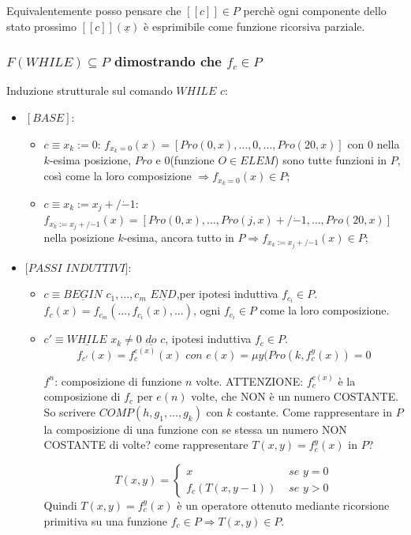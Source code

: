 \documentclass{article}
\begin{document}
Equivalentemente posso pensare che $[[c]] \in P$ perchè ogni componente dello stato prossimo $[[c]](\underline{x})$ è esprimibile come funzione ricorsiva parziale.


\subsubsection{$F(WHILE) \subseteq P$ dimostrando che $f_c \in P$}
Induzione strutturale sul comando $WHILE$ $c$:
\begin{itemize}
	\item $[BASE]$: 
		\begin{itemize}
			\item $c \equiv x_k:=0$: $f_{x_k=0}(x)=[Pro(0,x),\dots, 0, \dots, Pro(20,x)]$ con $0$ nella $k$-esima posizione, $Pro$ e $0$(funzione $O \in ELEM$) sono tutte funzioni in $P$, così come la loro composizione $\Rightarrow f_{x_k=0}(x) \in P$;
			\item $c \equiv x_k:=x_j +/\dot{-} 1$: $f_{x_k:=x_j +/\dot{-} 1}(x)= [Pro(0,x),\dots, Pro(j,x)+/\dot{-}1, \dots, Pro(20,x)]$ nella posizione $k$-esima, ancora tutto in $P \Rightarrow f_{x_k:=x_j +/\dot{-} 1}(x) \in P$;
		\end{itemize}
	\item $[PASSI$ $INDUTTIVI]$:
		\begin{itemize}
			\item $c \equiv \underline{BEGIN}$ $c_1,\dots,c_m$ $\underline{END}$,per ipotesi induttiva $f_{c_i} \in P$. $f_c(x)=f_{c_m}(\dots,f_{c_i}(x),\dots)$, ogni $f_{c_i} \in P$ come la loro composizione.
			\item $c' \equiv \underline{WHILE}$ $x_k \neq 0$ $\underline{do}$ $c$, ipotesi induttiva $f_c \in P$. 
				\begin{displaymath}
					f_{c'}(x)=f_c^{e(x)}(x) \textit{ con } e(x)=\mu y (Pro(k, f_c^y(x))=0
				\end{displaymath}		
				
				$f^n$: composizione di funzione $n$ volte.
				ATTENZIONE: $f_c^{e(x)}$ è la composizione di $f_c$ per $e(n)$ volte, che NON è un numero COSTANTE. So scrivere $COMP(h,g_1,\dots,g_k)$ con $k$ costante. Come rappresentare in $P$ la composizione di una funzione con se stessa un numero NON COSTANTE di volte? come rappresentare $T(x,y)=f_c^y(x)$ in $P$? 
		
\begin{displaymath}
	T(x,y)=
	\begin{cases}
		x &\textit{ se } y=0 \\
		f_c(T(x,y-1)) &\textit{ se } y>0
	\end{cases}
\end{displaymath}
Quindi $T(x,y)=f_c^y(x)$ è un operatore ottenuto mediante ricorsione primitiva su una funzione $f_c \in P \Rightarrow T(x,y) \in P$.



\end{itemize}
\end{itemize}
\end{document}
